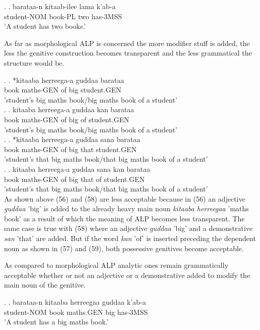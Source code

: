 \documentclass[11pt,a4paper]{article}
\begin{document}
	\ex.
	\ag.
	barataa-n kitaab-ilee lama k'ab-a\\
	student-NOM book-PL two has-3MSS\\
	'A student has two books.'
	
	As far as morphological ALP is concerned the more modifier stuff is added, the less the genitive construction becomes transparent and the less grammatical the structure would be. 
	
	\ex.
	\ag.
	*kitaaba herreega-a guddaa barataa\\
	book maths-GEN of big student.GEN\\
	'student's big maths book/big maths book of a student'\\
	
	\ex.
	\ag.
	kitaaba herreega-a guddaa kan barataa\\
	book maths-GEN of big of student.GEN\\
	'student's big maths book/big maths book of a student'\\
	
	\ex.
	\ag.
	*kitaaba herreega-a guddaa sana barataa\\
	book maths-GEN of big that student.GEN\\
	'student's that big maths book/that big maths book of a student'\\
	
	\ex.
	\ag.
	kitaaba herreega-a guddaa sana kan barataa\\
	book maths-GEN of big that of student.GEN\\
	'student's that big maths book/that big maths book of a student'\\
	
	As shown above (56) and (58) are less acceptable because in (56) an adjective \emph{guddaa} 'big' is added to the already heavy main noun \emph{kitaaba herreegaa} 'maths book' as a result of which the meaning of ALP becomes less transparent. The same case is true with (58) where an adjective \emph{guddaa} 'big' and a demonstrative \emph{san} 'that' are added. But if the word \emph{kan} 'of' is inserted preceding the dependent noun as shown in (57) and (59), both possessive genitives become acceptable. 
	
	As compared to morphological ALP analytic ones remain grammatically acceptable whether or not an adjective or a demonstrative added to modify the main noun of the genitive.
	
	\ex.
	\ag.
	barataa-n kitaaba herreegaa guddaa k'ab-a\\
	student-NOM book maths.GEN big has-3MSS\\
	'A student has a big maths book.'
	
\end{document}
